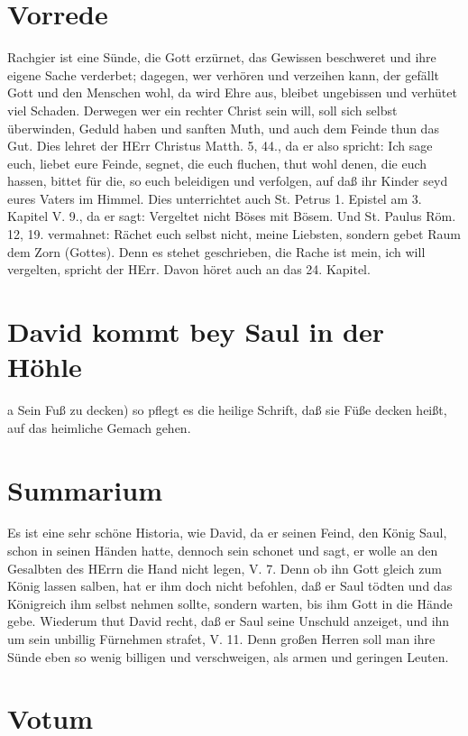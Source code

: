 \section{Vorrede}

Rachgier ist eine Sünde, die Gott erzürnet, das Gewissen beschweret und ihre eigene Sache verderbet; dagegen, wer verhören und verzeihen kann, der gefällt Gott und den Menschen wohl, da wird Ehre aus, bleibet ungebissen und verhütet viel Schaden. Derwegen wer ein rechter Christ sein will, soll sich selbst überwinden, Geduld haben und sanften Muth, und auch dem Feinde thun das Gut. Dies lehret der HErr Christus Matth. 5, 44., da er also spricht: Ich sage euch, liebet eure Feinde, segnet, die euch fluchen, thut wohl denen, die euch hassen, bittet für die, so euch beleidigen und verfolgen, auf daß ihr Kinder seyd eures Vaters im Himmel. Dies unterrichtet auch St. Petrus 1. Epistel am 3. Kapitel V. 9., da er sagt: Vergeltet nicht Böses mit Bösem. Und St. Paulus Röm. 12, 19. vermahnet: Rächet euch selbst nicht, meine Liebsten, sondern gebet Raum dem Zorn (Gottes). Denn es stehet geschrieben, die Rache ist mein, ich will vergelten, spricht der HErr. Davon höret auch an das 24. Kapitel.

\section{David kommt bey Saul in der Höhle}

a Sein Fuß zu decken) so pflegt es die heilige Schrift, daß sie Füße decken heißt, auf das heimliche Gemach gehen.

\section{Summarium}

Es ist eine sehr schöne Historia, wie David, da er seinen Feind, den König Saul, schon in seinen Händen hatte, dennoch sein schonet und sagt, er wolle an den Gesalbten des HErrn die Hand nicht legen, V. 7. Denn ob ihn Gott gleich zum König lassen salben, hat er ihm doch nicht befohlen, daß er Saul tödten und das Königreich ihm selbst nehmen sollte, sondern warten, bis ihm Gott in die Hände gebe. Wiederum thut David recht, daß er Saul seine Unschuld anzeiget, und ihn um sein unbillig Fürnehmen strafet, V. 11. Denn großen Herren soll man ihre Sünde eben so wenig billigen und verschweigen, als armen und geringen Leuten.

\section{Votum}

